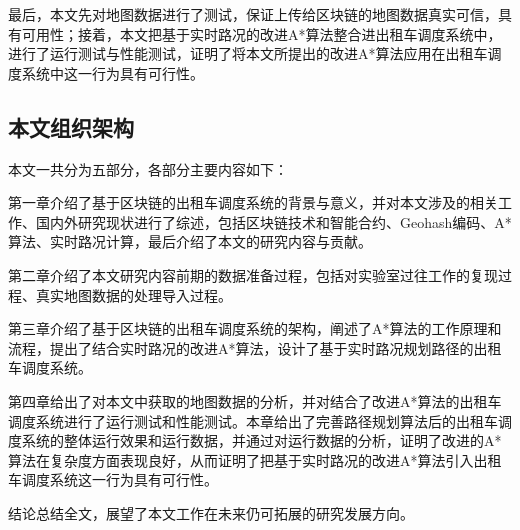 最后，本文先对地图数据进行了测试，保证上传给区块链的地图数据真实可信，具有可用性；接着，本文把基于实时路况的改进A*算法整合进出租车调度系统中，进行了运行测试与性能测试，证明了将本文所提出的改进A*算法应用在出租车调度系统中这一行为具有可行性。

\subsection{本文组织架构}

本文一共分为五部分，各部分主要内容如下：

第一章介绍了基于区块链的出租车调度系统的背景与意义，并对本文涉及的相关工作、国内外研究现状进行了综述，包括区块链技术和智能合约、Geohash编码、A*算法、实时路况计算，最后介绍了本文的研究内容与贡献。

第二章介绍了本文研究内容前期的数据准备过程，包括对实验室过往工作的复现过程、真实地图数据的处理导入过程。

第三章介绍了基于区块链的出租车调度系统的架构，阐述了A*算法的工作原理和流程，提出了结合实时路况的改进A*算法，设计了基于实时路况规划路径的出租车调度系统。

第四章给出了对本文中获取的地图数据的分析，并对结合了改进A*算法的出租车调度系统进行了运行测试和性能测试。本章给出了完善路径规划算法后的出租车调度系统的整体运行效果和运行数据，并通过对运行数据的分析，证明了改进的A*算法在复杂度方面表现良好，从而证明了把基于实时路况的改进A*算法引入出租车调度系统这一行为具有可行性。

结论总结全文，展望了本文工作在未来仍可拓展的研究发展方向。